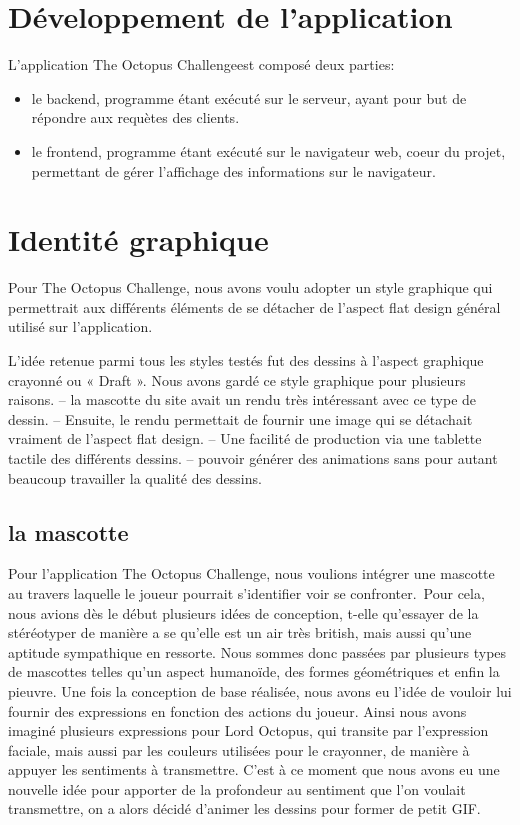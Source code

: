 \documentclass[a4paper,11pt, oneside]{book}
\def\appName{The Octopus Challenge}
\def\octopusName{Lord Octopus}
\begin{document}
\clearpage
\section{Développement de l'application}


L'application \appName est composé deux parties:
\begin{itemize}
	\item le backend, programme étant exécuté sur le serveur, ayant pour but de répondre aux requètes des clients.
	\item le frontend, programme étant exécuté sur le navigateur web, coeur du projet, permettant de gérer l'affichage des informations sur le navigateur.
\end{itemize}

\section{Identité graphique}
Pour \appName, nous avons voulu adopter un style graphique qui permettrait aux différents éléments de se détacher de l’aspect flat design général utilisé sur l’application.

L’idée retenue parmi tous les styles testés fut des dessins à l’aspect graphique crayonné ou « Draft ».
Nous avons gardé ce style graphique pour plusieurs raisons.
– la mascotte du site avait un rendu très intéressant avec ce type de dessin. 
– Ensuite, le rendu permettait de fournir une image qui se détachait vraiment de l’aspect flat design.
– Une facilité de production via une tablette tactile des différents dessins.
– pouvoir générer des animations sans pour autant beaucoup travailler la qualité des dessins.

\subsection*{la mascotte}
Pour l’application \appName, nous voulions intégrer une mascotte au travers laquelle le joueur pourrait s’identifier voir se confronter.\
Pour cela, nous avions dès le début plusieurs idées de conception, t-elle qu’essayer de la stéréotyper de manière a se qu’elle est un air très british, mais aussi qu’une aptitude sympathique en ressorte.
Nous sommes donc passées par plusieurs types de mascottes telles qu’un aspect humanoïde, des formes géométriques et enfin la pieuvre.
Une fois la conception de base réalisée, nous avons eu l’idée de vouloir lui fournir des expressions en fonction des actions du joueur.
Ainsi nous avons imaginé plusieurs expressions pour \octopusName, qui transite par l’expression faciale, mais aussi par les couleurs utilisées pour le crayonner, de manière à appuyer les sentiments à transmettre. C’est à ce moment que nous avons eu une nouvelle idée pour apporter de la profondeur au sentiment que l’on voulait transmettre, on a alors décidé d’animer les dessins pour former de petit GIF.
\end{document}
